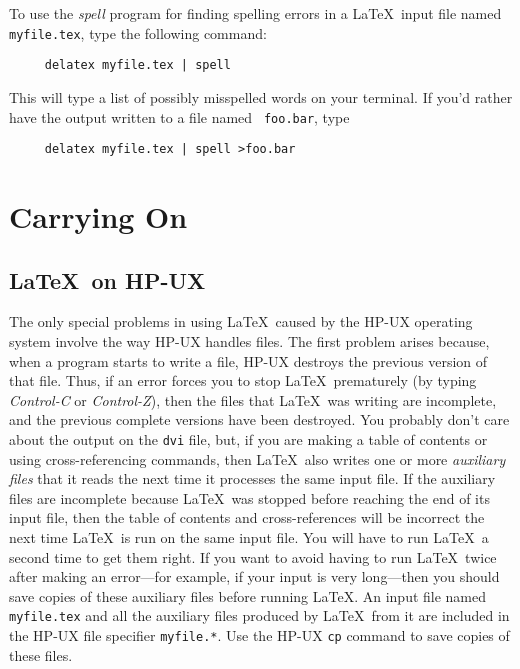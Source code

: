 To use the {\em spell\/} program for finding spelling errors in a
\LaTeX\ input file named \mbox{\tt myfile.tex}, type the following
command:
\begin{verbatim}
     delatex myfile.tex | spell
\end{verbatim}
This will type a list of possibly misspelled words on your terminal.
If you'd rather have the output written to a file named \mbox{\tt
foo.bar}, type
\begin{verbatim}
     delatex myfile.tex | spell >foo.bar
\end{verbatim}

\section{Carrying On}

\subsection{\LaTeX\ on HP-UX} \label{sec:op-system}

The only special problems in using \LaTeX\ caused by the HP-UX
operating system involve the way HP-UX handles files.  The first
problem arises because, when a program starts to write a file, HP-UX
destroys the previous version of that file.  Thus, if an error forces
you to stop \LaTeX\ prematurely (by typing {\em Control-C\/} or {\em
Control-Z\/}), then the files that \LaTeX\ was writing are incomplete,
and the previous complete versions have been destroyed.  You probably
don't care about the output on the {\tt dvi} file, but, if you are
making a table of contents or using cross-referencing commands, then
\LaTeX\ also writes one or more {\em auxiliary files\/} that it reads
the next time it processes the same input file.  If the auxiliary files
are incomplete because \LaTeX\ was stopped before reaching the end of
its input file, then the table of contents and cross-references will be
incorrect the next time \LaTeX\ is run on the same input file.  You
will have to run \LaTeX\ a second time to get them right.  If you want
to avoid having to run \LaTeX\ twice after making an error---for
example, if your input is very long---then you should save copies of
these auxiliary files before running \LaTeX. An input file named
\mbox{\tt myfile.tex} and all the auxiliary files produced by \LaTeX\
from it are included in the HP-UX file specifier \mbox{\tt myfile.*}.
Use the HP-UX {\tt cp} command to save copies of these files.

